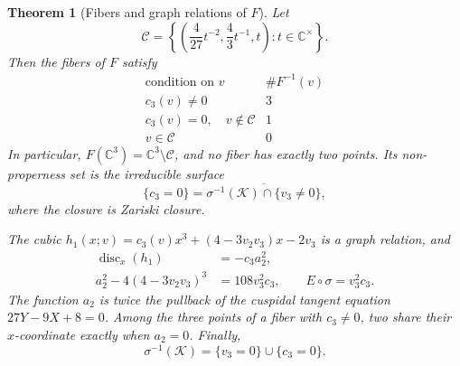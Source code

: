 \documentclass[11pt]{article}
\numberwithin{equation}{section}
\theoremstyle{plain}
\newtheorem{theorem}{Theorem}[section]
\theoremstyle{definition}
\theoremstyle{remark}
\newcommand{\C}{\mathbb{C}}
\begin{document}
\begin{theorem}[Fibers and graph relations of $F$]\label{thm:strat3}
Let
\[
 \mathcal C=\left\{\left(\frac4{27}t^{-2},\frac43t^{-1},t\right):
 t\in\C^\times\right\}.
\]
Then the fibers of $F$ satisfy
\[
\begin{array}{c|c}
 \text{condition on }v&\#F^{-1}(v)\\ \hline
 c_3(v)\ne0&3\\
 c_3(v)=0,\quad v\notin\mathcal C&1\\
 v\in\mathcal C&0
\end{array}
\]
In particular, $F(\C^3)=\C^3\setminus\mathcal C$, and no fiber has
exactly two points. Its non-properness set is the irreducible surface
\[
 \{c_3=0\}=\overline{\sigma^{-1}(\mathcal K)\cap\{v_3\ne0\}},
\]
where the closure is Zariski closure.

The cubic $h_1(x;v)=c_3(v)x^3+(4-3v_2v_3)x-2v_3$ is a graph relation, and
\begin{align*}
 \operatorname{disc}_x(h_1)&=-c_3a_2^2,\\
 a_2^2-4(4-3v_2v_3)^3&=108v_3^2c_3,\qquad E\circ\sigma=v_3^2c_3.
\end{align*}
The function $a_2$ is twice the pullback of the cuspidal tangent equation
$27Y-9X+8=0$. Among the three points of a fiber with $c_3\ne0$, two
share their $x$-coordinate exactly when $a_2=0$. Finally,
\[
 \sigma^{-1}(\mathcal K)=\{v_3=0\}\cup\{c_3=0\}.
\]
\end{theorem}
\end{document}
